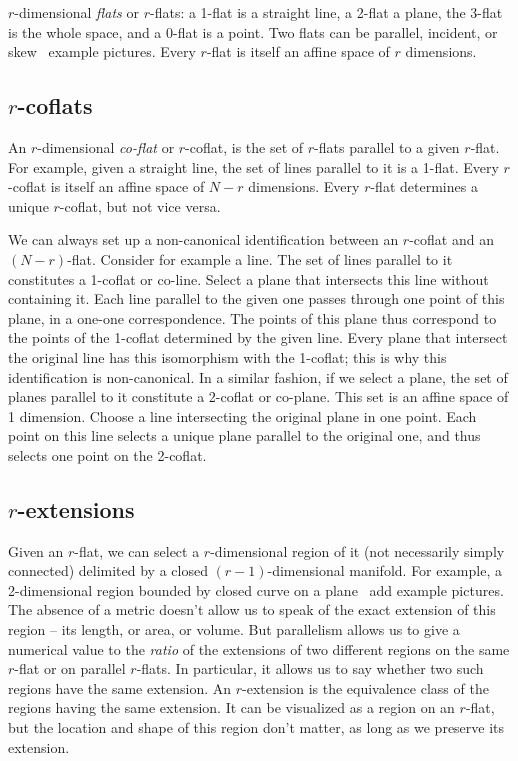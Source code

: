 \documentclass[\ifafour a4paper,12pt,\else a5paper,10pt,\fi%
onecolumn,oneside,article,%
british%
]{memoir}
\theoremstyle{remark}
\theoremstyle{innote}
\renewcommand*{\|}{\nonscript\,\vert\nonscript\;\mathopen{}}
\newcommand*{\puzzle}{{\fontencoding{U}\fontfamily{fontawesometwo}\selectfont\symbol{225}}}
\newcommand{\mynote}[1]{ {\color{notecolour}\puzzle\ #1}}
\newcommand*{\yr}{r}
\newcommand*{\yN}{N}
\begin{document}
$\yr$-dimensional \emph{flats} or $\yr$-flats: a 1-flat is a straight line,
a 2-flat a plane, the 3-flat is the whole space, and a 0-flat is a point.
Two flats can be parallel, incident, or skew \mynote{example pictures}.
Every $\yr$-flat is itself an affine space of $\yr$ dimensions.

\subsection{$\yr$-coflats}
\label{sec:coflats}

An $\yr$-dimensional \emph{co-flat} or $\yr$-coflat, is the set of
$\yr$-flats parallel to a given $\yr$-flat. For example, given a straight
line, the set of lines parallel to it is a 1-flat. Every $\yr$-coflat is
itself an affine space of $\yN-\yr$ dimensions. Every $\yr$-flat determines
a unique $\yr$-coflat, but not vice versa.

We can always set up a non-canonical identification between an $\yr$-coflat
and an $(\yN-\yr)$-flat. Consider for example a line. The set of lines
parallel to it constitutes a 1-coflat or co-line. Select a plane that
intersects this line without containing it. Each line parallel to the given
one passes through one point of this plane, in a one-one correspondence.
The points of this plane thus correspond to the points of the 1-coflat
determined by the given line. Every plane that intersect the original line
has this isomorphism with the 1-coflat; this is why this identification is
non-canonical. In a similar fashion, if we select a plane, the set of
planes parallel to it constitute a 2-coflat or co-plane. This set is an
affine space of 1 dimension. Choose a line intersecting the original plane
in one point. Each point on this line selects a unique plane parallel to
the original one, and thus selects one point on the 2-coflat.


\subsection{$\yr$-extensions}
\label{sec:extensions}

Given an $\yr$-flat, we can select a $\yr$-dimensional region of it (not
necessarily simply connected) delimited by a closed $(\yr-1)$-dimensional
manifold. For example, a 2-dimensional region bounded by closed curve on a
plane \mynote{add example pictures}. The absence of a metric doesn't allow
us to speak of the exact extension of this region -- its length, or area,
or volume. But parallelism allows us to give a numerical value to the
\emph{ratio} of the extensions of two different regions on the same
$\yr$-flat or on parallel $\yr$-flats. In particular, it allows us to say
whether two such regions have the same extension. An $\yr$-extension is the
equivalence class of the regions having the same extension. It can be
visualized as a region on an $\yr$-flat, but the location and shape of this
region don't matter, as long as we preserve its extension.
\end{document}
